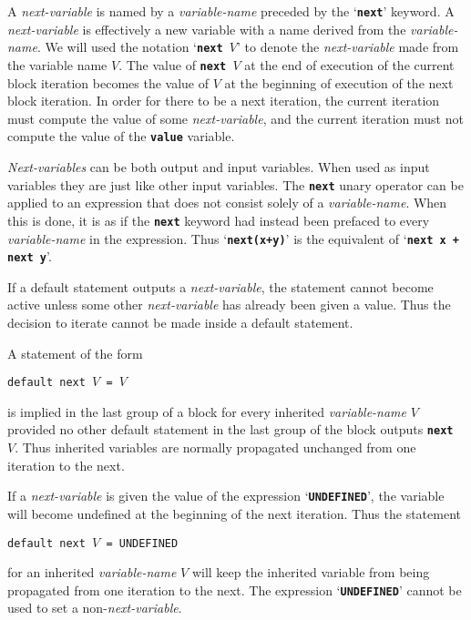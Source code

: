 \documentclass[12pt]{article}
\makeatletter
\newcommand{\TT}[1]{{\tt \bfseries #1}}
\newcommand{\ttkey}[1]{\TT{#1}\index{#1@{\tt #1}}}
\makeatother
\begin{document}
A {\em next-variable} is named by a {\em variable-name} preceded by
the `\ttkey{next}' keyword.  A {\em next-variable}
is effectively a new variable with a name derived from the
{\em variable-name}.  We will used the notation `\TT{next }$V$'
to denote the {\em next-variable} made from the variable name $V$.
The value of \TT{next }$V$ at the end of execution of the
current block iteration becomes the value of $V$ at the beginning
of execution of the next block iteration.  In order for there to be
a next iteration, the current iteration must compute the value of
some {\em next-variable}, and the current iteration must not compute
the value of the \TT{value} variable.

{\em Next-variables} can be both output and input variables.
When used as input variables they are just like other input variables.
The \TT{next} unary operator can be applied to an expression that does not
consist solely of a {\em variable-name}.  When this is done, it is
as if the \TT{next} keyword had instead been prefaced to every
{\em variable-name} in the expression.  Thus `\TT{next(x+y)}' is
the equivalent of `\TT{next x + next y}'.

If a default statement outputs a {\em next-variable}, the statement
cannot become active unless some other {\em next-variable} has already
been given a value.  Thus the decision to iterate cannot be made inside
a default statement.

A statement of the form

\begin{center}
\verb|default next |$V$\verb| = |$V$
\end{center}

is implied in the last group of a block
for every inherited {\em variable-name} $V$ provided
no other default statement in the last group of the block
outputs \TT{next }$V$.
Thus inherited variables are normally propagated unchanged from
one iteration to the next.

If a {\em next-variable} is given the value of
the expression `\ttkey{UNDEFINED}',\label{UNDEFINED}
the variable will become undefined
at the beginning of the next iteration.  Thus the statement

\begin{center}
\verb|default next |$V$\verb| = UNDEFINED|
\end{center}

for an inherited {\em variable-name} $V$ will keep the inherited
variable from being propagated from one iteration to the next.
The expression `\TT{UNDEFINED}' cannot be used to set a
non-{\em next-variable}.
\end{document}

